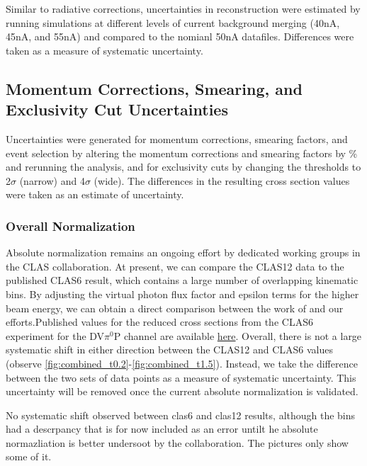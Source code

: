     Similar to radiative corrections, uncertainties in reconstruction were estimated by running simulations at different levels of current background merging (40nA, 45nA, and 55nA) and compared to the nomianl 50nA datafiles. Differences were taken as a measure of systematic uncertainty. 

    \subsection*{Momentum Corrections, Smearing, and Exclusivity Cut Uncertainties}
    Uncertainties were generated for momentum corrections, smearing factors, and event selection by altering the momentum corrections and smearing factors by \% and rerunning the analysis, and for exclusivity cuts by changing the thresholds to 2$\sigma$ (narrow) and 4$\sigma$ (wide). The differences in the resulting cross section values were taken as an estimate of uncertainty. 
        
    \subsubsection*{Overall Normalization}

    Absolute normalization remains an ongoing effort by dedicated working groups in the CLAS collaboration. At present, we can compare the CLAS12 data to the published CLAS6 result, which contains a large number of overlapping kinematic bins. By adjusting the virtual photon flux factor and epsilon terms for the higher beam energy, we can obtain a direct comparison between the work of \parencite{Bedlinskiy2014ExclusiveCLAS} and our efforts.Published values for the reduced cross sections from the CLAS6 experiment for the DV$\pi^0$P channel are available \href{https://journals.aps.org/prc/supplemental/10.1103/PhysRevC.90.025205}{here}. Overall, there is not a large systematic shift in either direction between the CLAS12 and CLAS6 values (observe \ref{fig:combined_t0.2}-\ref{fig:combined_t1.5}). Instead, we take the difference between the two sets of data points as a measure of systematic uncertainty. This uncertainty will be removed once the current absolute normalization is validated. 

    

    \iffalse
    No systematic shift observed between clas6 and clas12 results, although the bins had a descrpancy that is for now included as an error untilt he absolute normazliation is better undersoot by the collaboration. The pictures only show some of it. 

